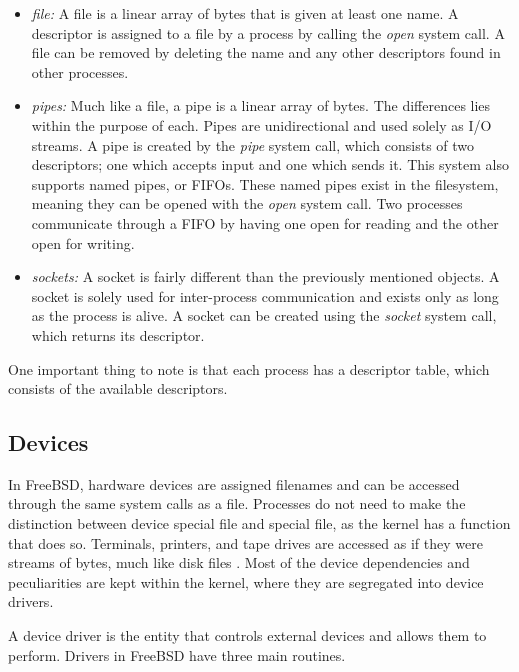 \documentclass[10pt, onecolumn]{IEEEtran}
\begin{document}
            \begin{itemize}
                \item \textit{file:} A file is a linear array of bytes that is given at least one name. A descriptor is assigned to a file by a process by calling the \textit{open} system call. A file can be removed by deleting the name and any other descriptors found in other processes.
                \item \textit{pipes:} Much like a file, a pipe is a linear array of bytes. The differences lies within the purpose of each. Pipes are unidirectional and used solely as I/O streams. A pipe is created by the \textit{pipe} system call, which consists of two descriptors; one which accepts input and one which sends it. This system also supports named pipes, or FIFOs. These named pipes exist in the filesystem, meaning they can be opened with the \textit{open} system call. Two processes communicate through a FIFO by having one open for reading and the other open for writing.
                \item \textit{sockets:} A socket is fairly different than the previously mentioned objects. A socket is solely used for inter-process communication and exists only as long as the process is alive. A socket can be created using the \textit{socket} system call, which returns its descriptor.
            \end{itemize}
            
            One important thing to note is that each process has a descriptor table, which consists of the available descriptors.
            
        
        \subsection{Devices}
            In FreeBSD, hardware devices are assigned filenames and can be accessed through the same system calls as a file. Processes do not need to make the distinction between device special file and special file, as the kernel has a function that does so. Terminals, printers, and tape drives are accessed as if they were streams of bytes, much like disk files \cite{ch13}. Most of the device dependencies and peculiarities are kept within the kernel, where they are segregated into device drivers.
            
            \vspace{1.5mm}
            
            A device driver is the entity that controls external devices and allows them to perform. Drivers in FreeBSD have three main routines.
            
\end{document}
